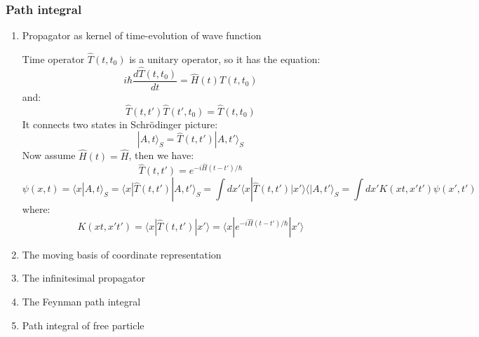 \documentclass[12pt]{article}
\numberwithin{equation}{section}
\begin{document}
\subsubsection{Path integral}
\begin{enumerate}
\item Propagator as kernel of time-evolution of wave function \par
	Time operator $\hat{T}(t, t_0)$ is a unitary operator, so it has the equation:
	\begin{equation}
		i\hbar\frac{d\hat{T}(t, t_0)}{dt}=\hat{H}(t)\hat{T}(t,t_0)
	\end{equation}
	and:
	\begin{equation}
		\hat{T}(t, t')\hat{T}(t', t_0)=\hat{T}(t, t_0)
	\end{equation}
	It connects two states in Schr\"{o}dinger picture:
	\begin{equation}
		|A,t\rangle_S=\hat{T}(t, t')|A,t'\rangle_S
	\end{equation}
	Now assume $\hat{H}(t)=\hat{H}$, then we have:
	\begin{equation}
		\hat{T}(t, t')=e^{-i\hat{H}(t-t')/\hbar}
	\end{equation}
	\begin{equation}
		\psi(x,t)=\langle x|A, t\rangle_S=\langle x|\hat{T}(t, t')|A,t'\rangle_S
		=\int dx'\langle x|\hat{T}(t, t')|x'\rangle \langle|A,t'\rangle_S
		=\int dx'K(xt,x't')\psi(x',t')
	\end{equation}
	where:
	\begin{equation}
		K(xt,x't') = \langle x|\hat{T}(t, t')|x'\rangle =\langle x| e^{-i\hat{H}(t-t')/\hbar} |x'\rangle
	\end{equation}
\item The moving basis of coordinate representation

\item The infinitesimal propagator
\item The Feynman path integral
\item Path integral of free particle
\end{enumerate}
\end{document}
